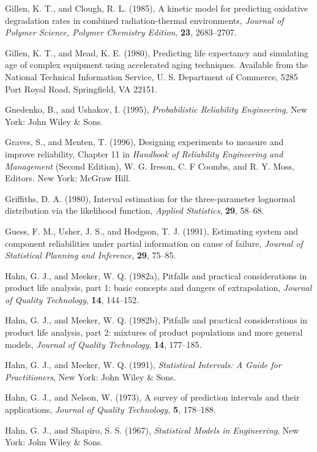 \begin{thebibliography}{999}
Gillen, K. T., and Clough, R. L. (1985), A kinetic model for predicting
oxidative degradation rates in combined radiation-thermal
environments, {\em Journal of Polymer Science, Polymer Chemistry
Edition}, {\bf 23}, 2683--2707.

Gillen, K. T., and Mead, K. E. (1980), Predicting life expectancy
and simulating age of complex equipment using accelerated aging
techniques.  Available from the National Technical Information
Service, U. S. Department of Commerce, 5285 Port Royal Road,
Springfield, VA 22151.

Gnedenko, B., and Ushakov, I. (1995), {\em Probabilistic Reliability
Engineering}, New York: John Wiley \& Sons.

Graves, S., and Menten, T. (1996), Designing experiments to measure
and improve reliability, Chapter 11 in {\em Handbook of Reliability
Engineering and Management} (Second Edition), W. G. Ireson, C. F
Coombs, and R. Y.  Moss, Editors.  New York: McGraw Hill.

Griffiths, D. A.  (1980), Interval estimation for the three-parameter
lognormal distribution via the likelihood function, {\em Applied
Statistics}, {\bf 29}, 58--68.

Guess, F. M., Usher, J. S., and Hodgson, T. J. (1991), Estimating
system and component reliabilities under partial information on cause
of failure, {\em Journal of Statistical Planning and Inference},
{\bf 29}, 75--85.


Hahn, G. J., and Meeker, W. Q. (1982a), Pitfalls and practical
considerations in product life analysis, part 1: basic concepts and
dangers of extrapolation,  {\em Journal of Quality Technology},
{\bf 14}, 144--152.

Hahn, G. J., and Meeker, W. Q. (1982b), Pitfalls and practical
considerations in product life analysis, part 2: mixtures of product
populations and more general models, {\em Journal of Quality
Technology}, {\bf 14}, 177--185.

Hahn, G. J., and Meeker, W. Q. (1991), {\em Statistical Intervals: A
Guide for Practitioners}, New York: John Wiley \& Sons.

Hahn, G. J., and Nelson, W. (1973), A survey of prediction intervals
and their applications, {\em Journal of Quality Technology, } {\bf 5},
178--188.

Hahn, G. J., and Shapiro, S. S. (1967), {\em Statistical Models in
Engineering}, New York: John Wiley \& Sons.


\end{thebibliography}
